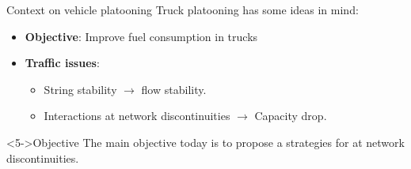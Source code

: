 \begin{frame}{Context on vehicle platooning}
    Truck platooning has some ideas in mind: 
      \begin{itemize}[<+->]
        \item \textbf{Objective}: Improve fuel consumption in trucks 
        \item \textbf{Traffic issues}: 
        \begin{itemize}
          \item String stability \(\rightarrow\) flow stability.
          \item Interactions at network discontinuities \(\rightarrow\) Capacity drop. 
        \end{itemize}  
      \end{itemize}
      \begin{block}<5->{Objective}
        The main objective today is to propose a strategies for  at network discontinuities. 
      \end{block}
    \end{frame}